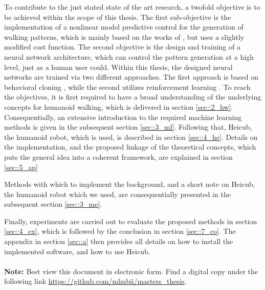 To contribute to the just stated state of the art research, a twofold objective is to be achieved within the scope of this thesis. The first sub-objective is the implementation of a nonlinear model predictive control for the generation of walking patterns, which is mainly based on the works of \cite{naveau2016reactive}, but uses a slightly modified cost function. The second objective is the design and training of a neural network architecture, which can control the pattern generation at a high level, just as a human user could. Within this thesis, the designed neural networks are trained via two different approaches. The first approach is based on behavioral cloning \cite{bojarski2016end}, while the second utilizes reinforcement learning \cite{schulman2017proximal}. To reach the objectives, it is first required to have a broad understanding of the underlying concepts for humanoid walking, which is delivered in section \ref{sec::2_hw}. Consequentially, an extensive introduction to the required machine learning methods is given in the subsequent section \ref{sec::3_ml}. Following that, Heicub, the humanoid robot, which is used, is described in section \ref{sec::4_he}. Details on the implementation, and the proposed linkage of the theoretical concepts, which puts the general idea into a coherent framework, are explained in section \ref{sec::5_ap}




 Methods with which to implement the background, and a short note on Heicub, the humanoid robot which we used, are consequentially presented in the subsequent section \ref{sec::3_me}. 



Finally, experiments are carried out to evaluate the proposed methods in section \ref{sec::4_ex}, which is followed by the conclusion in section \ref{sec::7_co}. The appendix in section \ref{sec::a} then provides all details on how to install the implemented software, and how to use Heicub.
\\\\
\textbf{Note:} Best view this document in electronic form. Find a digital copy under the following link \href{https://github.com/mhubii/masters_thesis}{\underline{https://github.com/mhubii/masters\_thesis}}.
